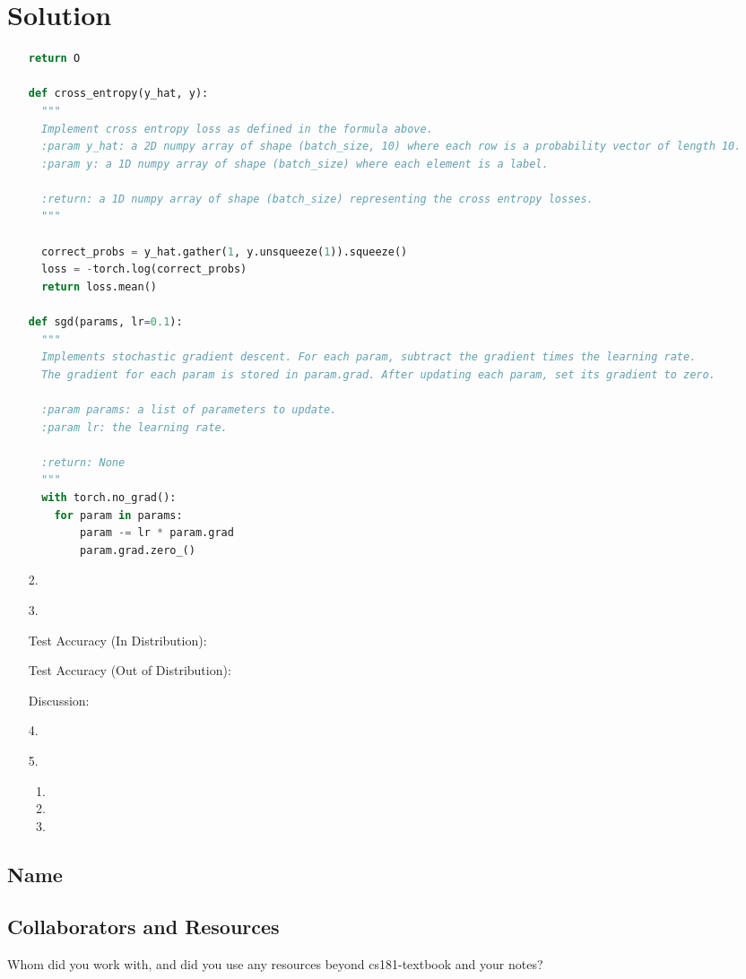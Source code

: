 \documentclass[submit]{harvardml}
\newenvironment{answer}
  {\section*{Solution}}
{}
\begin{document}
\begin{answer}
\begin{enumerate}
\begin{lstlisting}[language=Python]
    return O

def cross_entropy(y_hat, y):
  """
  Implement cross entropy loss as defined in the formula above.
  :param y_hat: a 2D numpy array of shape (batch_size, 10) where each row is a probability vector of length 10.
  :param y: a 1D numpy array of shape (batch_size) where each element is a label.

  :return: a 1D numpy array of shape (batch_size) representing the cross entropy losses.
  """

  correct_probs = y_hat.gather(1, y.unsqueeze(1)).squeeze()
  loss = -torch.log(correct_probs)
  return loss.mean() 

def sgd(params, lr=0.1):
  """
  Implements stochastic gradient descent. For each param, subtract the gradient times the learning rate.
  The gradient for each param is stored in param.grad. After updating each param, set its gradient to zero.

  :param params: a list of parameters to update.
  :param lr: the learning rate.

  :return: None
  """
  with torch.no_grad():
    for param in params:
        param -= lr * param.grad
        param.grad.zero_() 


\end{lstlisting}

    \item[2.]

    \item[3.]

      Test Accuracy (In Distribution):

      Test Accuracy (Out of Distribution):

      Discussion:

    \item[4.]

    \item[5.]

      \begin{enumerate}
        \item
        \item
        \item
      \end{enumerate}


  \end{enumerate}

\end{answer}


\newpage
\subsection*{Name}

\subsection*{Collaborators and Resources}
Whom did you work with, and did you use any resources beyond cs181-textbook and your notes?
\end{document}
